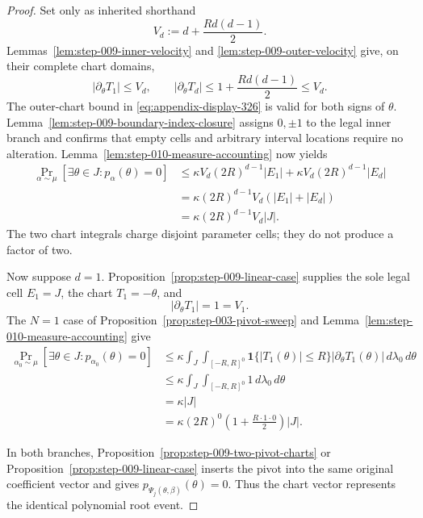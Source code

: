 \begin{proof}
Set only as inherited shorthand
\begin{equation}
\label{eq:appendix-display-325}
V_d:=d+\frac{Rd(d-1)}2.
\end{equation}
Lemmas~\ref{lem:step-009-inner-velocity} and \ref{lem:step-009-outer-velocity} give, on their complete chart domains,
\begin{equation}
\label{eq:appendix-display-326}
\lvert\partial_\theta T_1\rvert\leq V_d,
\qquad
\lvert\partial_\theta T_d\rvert
\leq1+\frac{Rd(d-1)}2
\leq V_d.
\end{equation}
The outer-chart bound in \eqref{eq:appendix-display-326} is valid for both
signs of \(\theta\). Lemma~\ref{lem:step-009-boundary-index-closure} assigns
\(0,\pm1\) to the legal inner branch and confirms that empty cells and
arbitrary interval locations require no alteration.
Lemma~\ref{lem:step-010-measure-accounting} now yields
\begin{equation}
\label{eq:appendix-display-327}
\begin{aligned}
\Pr_{\alpha\sim\mu}[\exists\theta\in J:p_\alpha(\theta)=0]
&\leq
\kappa V_d(2R)^{d-1}\lvert E_1\rvert
+\kappa V_d(2R)^{d-1}\lvert E_d\rvert\\
&=
\kappa(2R)^{d-1}V_d
(\lvert E_1\rvert+\lvert E_d\rvert)\\
&=
\kappa(2R)^{d-1}V_d\lvert J\rvert.
\end{aligned}
\end{equation}
The two chart integrals charge disjoint parameter cells; they do not produce a factor of two.

Now suppose \(d=1\). Proposition~\ref{prop:step-009-linear-case} supplies the sole legal cell \(E_1=J\), the chart \(T_1=-\theta\), and
\begin{equation}
\label{eq:appendix-display-328}
\lvert\partial_\theta T_1\rvert=1=V_1.
\end{equation}
The \(N=1\) case of Proposition~\ref{prop:step-003-pivot-sweep} and Lemma~\ref{lem:step-010-measure-accounting} give
\begin{equation}
\label{eq:appendix-display-329}
\begin{aligned}
\Pr_{\alpha_0\sim\mu}[\exists\theta\in J:p_{\alpha_0}(\theta)=0]
&\leq
\kappa\int_J\int_{[-R,R]^0}
\mathbf 1\{\lvert T_1(\theta)\rvert\leq R\}
\lvert\partial_\theta T_1(\theta)\rvert\,d\lambda_0\,d\theta\\
&\leq
\kappa\int_J\int_{[-R,R]^0}1\,d\lambda_0\,d\theta\\
&=\kappa\lvert J\rvert\\
&=\kappa(2R)^0
\left(1+\frac{R\cdot1\cdot0}{2}\right)\lvert J\rvert.
\end{aligned}
\end{equation}

In both branches, Proposition~\ref{prop:step-009-two-pivot-charts} or Proposition~\ref{prop:step-009-linear-case} inserts the pivot into the same original coefficient vector and gives \(p_{\Psi_j(\theta,\beta)}(\theta)=0\). Thus the chart vector represents the identical polynomial root event. 
\end{proof}

